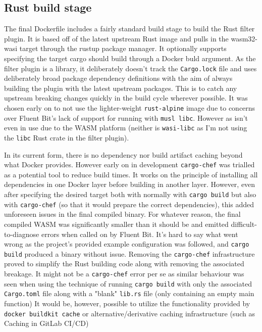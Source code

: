 \subsection{Rust build stage}
The final Dockerfile includes a fairly standard build stage to build the Rust filter plugin. It is based off of the latest upstream Rust image and pulls in the wasm32-wasi target through the rustup package manager. It optionally supports specifying the target cargo should build through a Docker buld argument. As the filter plugin is a library, it deliberately doesn't track the \texttt{Cargo.lock} file and uses deliberately broad package dependency definitions with the aim of always building the plugin with the latest upstream packages. This is to catch any upstream breaking changes quickly in the build cycle wherever possible. It was chosen early on to not use the lighter-weight \texttt{rust-alpine} image due to concerns over Fluent Bit's lack of support for running with \texttt{musl libc}. However as  isn't even in use due to the WASM platform (neither is \texttt{wasi-libc} as I'm not using the \texttt{libc} Rust crate in the filter plugin).

In its current form, there is no dependency nor build artifact caching beyond what Docker provides. However early on in development \texttt{cargo-chef} was trialled as a potential tool to reduce build times. It works on the principle of installing all dependencies in one Docker layer before building in another layer. However, even after specifying the desired target both with normally with \texttt{cargo build} but also with \texttt{cargo-chef} (so that it would prepare the correct dependencies), this added unforeseen issues in the final compiled binary. For whatever reason, the final compiled WASM was significantly smaller than it should be and emitted difficult-to-diagnose errors when called on by Fluent Bit. It's hard to say what went wrong as the project's provided example configuration was followed, and \texttt{cargo build} produced a binary without issue. Removing the \texttt{cargo-chef} infrastructure proved to simplify the Rust building code along with removing the associated breakage. It might not be a \texttt{cargo-chef} error per se as similar behaviour was seen when using the technique of running \texttt{cargo build} with only the associated \texttt{Cargo.toml} file along with a "blank" \texttt{lib.rs} file (only containing an empty main function)
It would be, however, possible to utilize the functionality provided by \texttt{docker buildkit cache} or alternative/derivative caching infrastructure (such as Caching in GitLab CI/CD)

